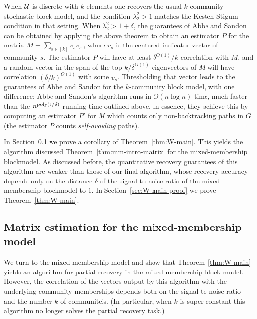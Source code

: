When $\mathcal U$ is discrete with $k$ elements one recovers the usual $k$-community stochastic block model, and the condition $\lambda_2^2 > 1$ matches the Kesten-Stigum condition in that setting.
When $\lambda_2^2 > 1 + \delta$, the guarantees of Abbe and Sandon can be obtained by applying the above theorem to obtain an estimator $P$ for the matrix $M = \sum_{s \in [k]} v_s v_s^\top$, where $v_s$ is the centered indicator vector of community $s$.
The estimator $P$ will have at least $\delta^{O(1)}/k$ correlation with $M$, and a random vector in the span of the top $k/\delta^{O(1)}$ eigenvectors of $M$ will have correlation $(\delta/k)^{O(1)}$ with some $v_s$.
Thresholding that vector leads to the guarantees of Abbe and Sandon for the $k$-community block model, with one difference: Abbe and Sandon's algorithm runs in $O(n \log n)$ time, much faster than the $n^{\operatorname{poly}(1/\delta)}$ running time outlined above.
In essence, they achieve this by computing an estimator $P'$ for $M$ which counts only non-backtracking paths in $G$ (the estimator $P$ counts \emph{self-avoiding} paths).

In Section~\ref{sec:mm-matrix-main} we prove a corollary of Theorem~\ref{thm:W-main}.
This yields the algorithm discussed Theorem~\ref{thm:mm-intro-matrix} for the mixed-membership blockmodel.
As discussed before, the quantitative recovery guarantees of this algorithm are weaker than those of our final algorithm, whose recovery accuracy depends only on the distance $\delta$ of the signal-to-noise ratio of the mixed-membership blockmodel to $1$.
In Section~\ref{sec:W-main-proof} we prove Theorem~\ref{thm:W-main}.

\subsection{Matrix estimation for the mixed-membership model}
\label{sec:mm-matrix-main}
We turn to the mixed-membership model and show that Theorem~\ref{thm:W-main} yields an algorithm for partial recovery in the mixed-membership block model.
However, the correlation of the vectors output by this algorithm with the underlying community memberships depends both on the signal-to-noise ratio and the number $k$ of communiteis.
(In particular, when $k$ is super-constant this algorithm no longer solves the partial recovery task.)

